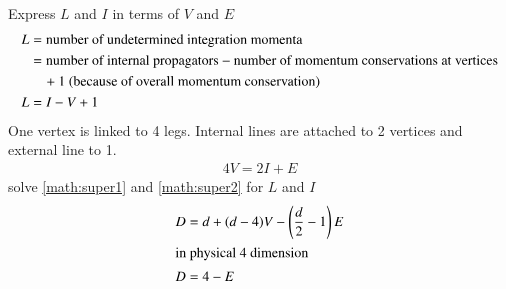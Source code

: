 Express $L$ and $I$ in terms of $V$ and $E$
\begin{align}
	L &= \text{number of undetermined integration momenta} \notag \\
	  &= \text{number of internal propagators} - \text{number of momentum conservations at vertices} \notag\\
	  &\quad+ 1 \text{ (because of overall momentum conservation)} \notag \\
	L &= I - V + 1 \label{math:super1}
\end{align}
One vertex is linked to 4 legs. Internal lines are attached to 2 vertices and external line to 1.
\begin{align}
	4V = 2I + E \label{math:super2}
\end{align}
solve \ref{math:super1} and \ref{math:super2} for $L$ and $I$
\begin{align}
	D &= d + (d-4) V - \left(\frac{d}{2} - 1\right)E \\
	\shortintertext{in physical 4 dimension}
	D &= 4 - E
\end{align}


